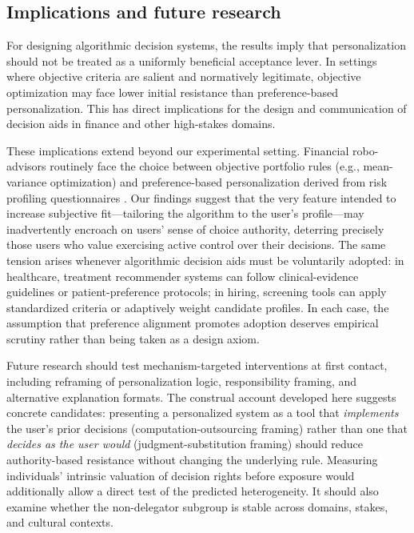 \documentclass[a4paper, 12pt, fleqn]{article}
\theoremstyle{definition}
\begin{document}
\subsection{Implications and future research}
For designing algorithmic decision systems, the results imply that personalization should not be treated as a uniformly beneficial acceptance lever. In settings where objective criteria are salient and normatively legitimate, objective optimization may face lower initial resistance than preference-based personalization. This has direct implications for the design and communication of decision aids in finance and other high-stakes domains.

These implications extend beyond our experimental setting. Financial robo-advisors routinely face the choice between objective portfolio rules (e.g., mean-variance optimization) and preference-based personalization derived from risk profiling questionnaires \citep{Capponi2022,Ruehr2020}. Our findings suggest that the very feature intended to increase subjective fit---tailoring the algorithm to the user's profile---may inadvertently encroach on users' sense of choice authority, deterring precisely those users who value exercising active control over their decisions. The same tension arises whenever algorithmic decision aids must be voluntarily adopted: in healthcare, treatment recommender systems can follow clinical-evidence guidelines or patient-preference protocols; in hiring, screening tools can apply standardized criteria or adaptively weight candidate profiles. In each case, the assumption that preference alignment promotes adoption deserves empirical scrutiny rather than being taken as a design axiom.

Future research should test mechanism-targeted interventions at first contact, including reframing of personalization logic, responsibility framing, and alternative explanation formats. The construal account developed here suggests concrete candidates: presenting a personalized system as a tool that \emph{implements} the user's prior decisions (computation-outsourcing framing) rather than one that \emph{decides as the user would} (judgment-substitution framing) should reduce authority-based resistance without changing the underlying rule. Measuring individuals' intrinsic valuation of decision rights \citep{Bartling2014,Owens2014} before exposure would additionally allow a direct test of the predicted heterogeneity. It should also examine whether the non-delegator subgroup is stable across domains, stakes, and cultural contexts.
\end{document}
